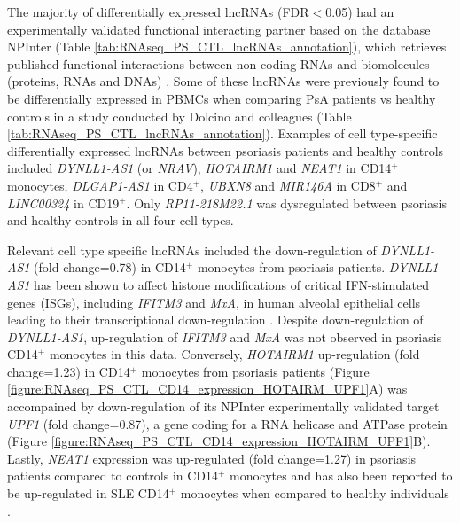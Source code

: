 The majority of differentially expressed lncRNAs (FDR$<$0.05) had an experimentally validated functional interacting partner based on the database NPInter (Table \ref{tab:RNAseq_PS_CTL_lncRNAs_annotation}), which retrieves published functional interactions between non-coding RNAs and biomolecules (proteins, RNAs and DNAs) \parencite{Hao2016}. Some of these lncRNAs were previously found to be differentially expressed in PBMCs when comparing PsA patients vs healthy controls in a study conducted by Dolcino and colleagues \parencite{Dolcino2018} (Table \ref{tab:RNAseq_PS_CTL_lncRNAs_annotation}). Examples of cell type-specific differentially expressed lncRNAs between psoriasis patients and healthy controls included \textit{DYNLL1-AS1} (or \textit{NRAV}), \textit{HOTAIRM1} and \textit{NEAT1} in CD14$^+$ monocytes, \textit{DLGAP1-AS1} in CD4$^+$, \textit{UBXN8} and \textit{MIR146A} in CD8$^+$ and \textit{LINC00324} in CD19$^+$. Only \textit{RP11-218M22.1} was dysregulated between psoriasis and healthy controls in all four cell types. 

Relevant cell type specific lncRNAs included the down-regulation of \textit{DYNLL1-AS1} (fold change=0.78) in CD14$^+$ monocytes from psoriasis patients. \textit{DYNLL1-AS1} has been shown to affect histone modifications of critical IFN-stimulated genes (ISGs), including \textit{IFITM3} and \textit{MxA}, in human alveolal epithelial cells leading to their transcriptional down-regulation \parencite{Ouyang2014}. Despite down-regulation of \textit{DYNLL1-AS1}, up-regulation of \textit{IFITM3} and \textit{MxA} was not observed in psoriasis CD14$^+$ monocytes in this data. Conversely, \textit{HOTAIRM1} up-regulation (fold change=1.23) in CD14$^+$ monocytes from psoriasis patients (Figure \ref{figure:RNAseq_PS_CTL_CD14_expression_HOTAIRM_UPF1}A) was accompained by down-regulation of its NPInter experimentally validated target \textit{UPF1} (fold change=0.87), a gene coding for a RNA helicase and ATPase protein \parencite{Hao2016} (Figure \ref{figure:RNAseq_PS_CTL_CD14_expression_HOTAIRM_UPF1}B). Lastly, \textit{NEAT1} expression was up-regulated (fold change=1.27) in psoriasis patients compared to controls in CD14$^+$ monocytes and has also been reported to be up-regulated in SLE CD14$^+$ monocytes when compared to healthy individuals \parencite{Zhang2016}.

